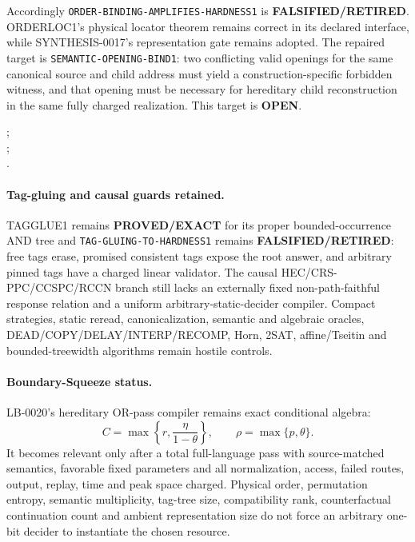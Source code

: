 \documentclass[11pt]{article}
\begin{document}
Accordingly \texttt{ORDER-BINDING-AMPLIFIES-HARDNESS1} is
\textbf{FALSIFIED/RETIRED}.  ORDERLOC1's physical locator theorem remains
correct in its declared interface, while SYNTHESIS-0017's representation gate
remains adopted.  The repaired target is
\texttt{SEMANTIC-OPENING-BIND1}: two conflicting valid openings for the same
canonical source and child address must yield a construction-specific
forbidden witness, and that opening must be necessary for hereditary child
reconstruction in the same fully charged realization.  This target is
\textbf{OPEN}.

;\\
;\\
.

\paragraph{Tag-gluing and causal guards retained.}
TAGGLUE1 remains \textbf{PROVED/EXACT} for its proper bounded-occurrence AND
tree and \texttt{TAG-GLUING-TO-HARDNESS1} remains
\textbf{FALSIFIED/RETIRED}: free tags erase, promised consistent tags expose
the root answer, and arbitrary pinned tags have a charged linear validator.
The causal HEC/CRS-PPC/CCSPC/RCCN branch still lacks an externally fixed
non-path-faithful response relation and a uniform arbitrary-static-decider
compiler.  Compact strategies, static reread, canonicalization, semantic and
algebraic oracles, DEAD/COPY/DELAY/INTERP/RECOMP, Horn, 2SAT, affine/Tseitin
and bounded-treewidth algorithms remain hostile controls.

\paragraph{Boundary-Squeeze status.}
LB-0020's hereditary OR-pass compiler remains exact conditional algebra:
\[
 C=\max\left\{r,\frac{\eta}{1-\theta}\right\},
 \qquad \rho=\max\{p,\theta\}.
\]
It becomes relevant only after a total full-language pass with source-matched
semantics, favorable fixed parameters and all normalization, access, failed
routes, output, replay, time and peak space charged.  Physical order,
permutation entropy, semantic multiplicity, tag-tree size, compatibility rank,
counterfactual continuation count and ambient representation size do not force
an arbitrary one-bit decider to instantiate the chosen resource.
\end{document}
